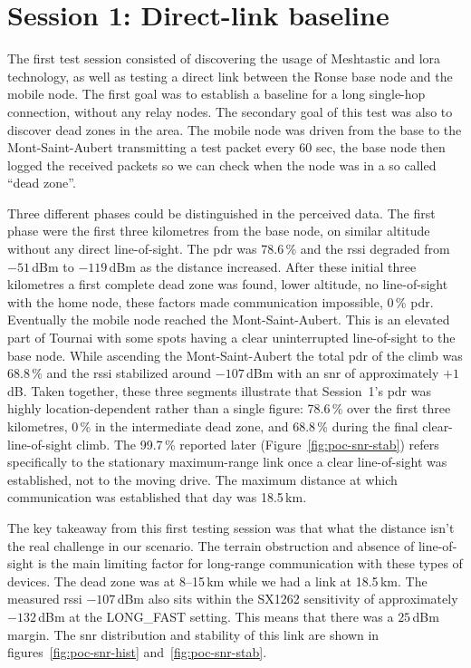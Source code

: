 \section{Session 1: Direct-link baseline}%
\label{sec:poc-session1}

The first test session consisted of discovering the usage of Meshtastic and \gls{lora} technology, as well as testing a direct link between the Ronse base node and the mobile node.
The first goal was to establish a baseline for a long single-hop connection, without any relay nodes. The secondary goal of this test was also to discover dead zones in the area.
The mobile node was driven from the base to the Mont-Saint-Aubert transmitting a test packet every 60 sec, the base node then logged the received packets so we can check when the node was in a so called ``dead zone''.

Three different phases could be distinguished in the perceived data. The first phase were the first three kilometres from the base node, on similar altitude without any direct line-of-sight.
The \gls{pdr} was 78.6\,\% and the \gls{rssi} degraded from $-51$\,dBm to $-119$\,dBm as the distance increased.
After these initial three kilometres a first complete dead zone was found, lower altitude, no line-of-sight with the home node, these factors made communication impossible, 0\,\% \gls{pdr}.
Eventually the mobile node reached the Mont-Saint-Aubert. This is an elevated part of Tournai with some spots having a clear uninterrupted line-of-sight to the base node.
While ascending the Mont-Saint-Aubert the total \gls{pdr} of the climb was 68.8\,\% and the \gls{rssi} stabilized around $-107$\,dBm with an \gls{snr} of approximately $+1$\,dB.
Taken together, these three segments illustrate that Session~1's \gls{pdr} was highly location-dependent rather than a single figure: 78.6\,\% over the first three kilometres, 0\,\% in the intermediate dead zone, and 68.8\,\% during the final clear-line-of-sight climb.
The 99.7\,\% reported later (Figure~\ref{fig:poc-snr-stab}) refers specifically to the stationary maximum-range link once a clear line-of-sight was established, not to the moving drive.
The maximum distance at which communication was established that day was 18.5\,km.

The key takeaway from this first testing session was that what the distance isn't the real challenge in our scenario. The terrain obstruction and absence of line-of-sight is the main limiting factor for long-range communication with these types of devices.
The dead zone was at 8--15\,km while we had a link at 18.5\,km.
The measured \gls{rssi} $-107$\,dBm also sits within the SX1262 sensitivity of approximately $-132$\,dBm at the LONG\_FAST setting.
This means that there was a $25$\,dBm margin. The \gls{snr} distribution and stability of this link are shown in figures~\ref{fig:poc-snr-hist} and~\ref{fig:poc-snr-stab}.

